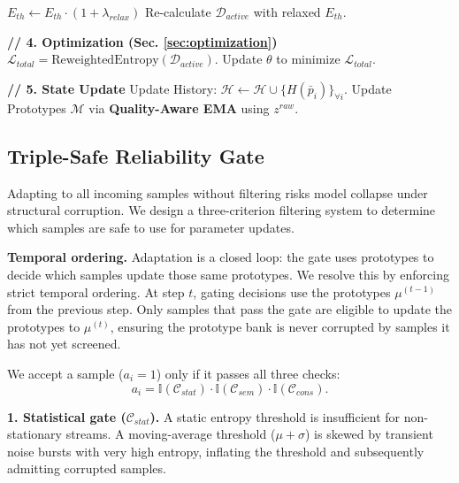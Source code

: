 \documentclass[sigconf, screen, review, anonymous]{acmart}
\theoremstyle{plain}
\theoremstyle{definition}
\theoremstyle{remark}
\begin{document}
\begin{algorithm}[tb]
\begin{algorithmic}[1]
		\STATE $E_{th} \leftarrow E_{th} \cdot (1 + \lambda_{relax})$ 
		\STATE Re-calculate $\mathcal{D}_{active}$ with relaxed $E_{th}$.
		\ENDIF
		
		\STATE \textbf{// 4. Optimization (Sec. \ref{sec:optimization})}
		\STATE $\mathcal{L}_{total} = \text{ReweightedEntropy}(\mathcal{D}_{active})$.
		\STATE Update $\theta$ to minimize $\mathcal{L}_{total}$.
		\ENDIF
		
		\STATE \textbf{// 5. State Update}
		\STATE Update History: $\mathcal{H} \leftarrow \mathcal{H} \cup \{H(\bar{p}_i)\}_{\forall i}$.
		\STATE Update Prototypes $\mathcal{M}$ via \textbf{Quality-Aware EMA} using $z^{raw}$.
		\ENDWHILE
	\end{algorithmic}
\end{algorithm}

\subsection{Triple-Safe Reliability Gate}
\label{sec:gate}

Adapting to all incoming samples without filtering risks model collapse under structural corruption. We design a three-criterion filtering system to determine which samples are safe to use for parameter updates.


\textbf{Temporal ordering.}
Adaptation is a closed loop: the gate uses prototypes to decide which samples update those same prototypes. We resolve this by enforcing strict temporal ordering. At step $t$, gating decisions use the prototypes $\mu^{(t-1)}$ from the previous step. Only samples that pass the gate are eligible to update the prototypes to $\mu^{(t)}$, ensuring the prototype bank is never corrupted by samples it has not yet screened.

We accept a sample ($a_i = 1$) only if it passes all three checks:
\begin{equation}
	a_i = \mathbb{I}\left( \mathcal{C}_{stat} \right) \cdot \mathbb{I}\left( \mathcal{C}_{sem} \right) \cdot \mathbb{I}\left( \mathcal{C}_{cons} \right).
	\label{eq:triple_gate}
\end{equation}

\textbf{1. Statistical gate ($\mathcal{C}_{stat}$).}
A static entropy threshold is insufficient for non-stationary streams. A moving-average threshold ($\mu + \sigma$) is skewed by transient noise bursts with very high entropy, inflating the threshold and subsequently admitting corrupted samples.
\end{document}

